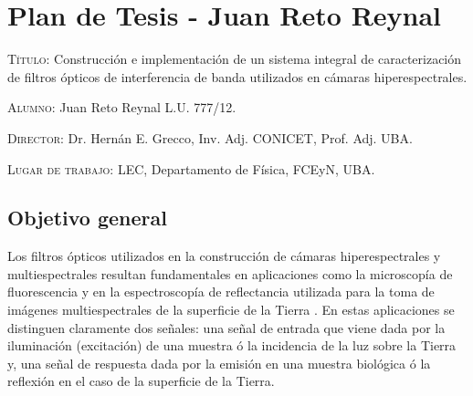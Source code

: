 \documentclass{ctuthesis}
\begin{document}
\maketitle
\renewcommand{\chaptername}{Capítulo}
\chapter*{Plan de Tesis - Juan Reto Reynal}


\textsc{Título:} Construcción e implementación de un sistema integral de 
caracterización de filtros ópticos de interferencia de banda utilizados en 
cámaras 
hiperespectrales.


\hspace{-0.4cm}\textsc{Alumno:} Juan Reto Reynal L.U. 777/12.

\hspace{-0.4cm}\textsc{Director:} Dr. Hernán E. Grecco, Inv. Adj. CONICET, Prof. Adj. UBA.

\hspace{-0.4cm}\textsc{Lugar de trabajo:} LEC, Departamento de Física, FCEyN, UBA.


\section*{Objetivo general}

Los filtros ópticos utilizados en la construcción de cámaras hiperespectrales y 
multiespectrales resultan fundamentales en aplicaciones como la microscopía de 
fluorescencia \cite{Grecco2016} y en la espectroscopía de reflectancia 
utilizada para la toma de 
imágenes multiespectrales de la superficie de la Tierra \cite{Hogg2008}. En 
estas aplicaciones 
se distinguen claramente dos señales: una señal de entrada que viene dada por 
la iluminación (excitación) de una muestra ó la incidencia de la luz sobre la 
Tierra y, una señal de respuesta dada por la emisión en una muestra 
biológica ó la reflexión en el caso de la superficie de la Tierra.
\end{document}
